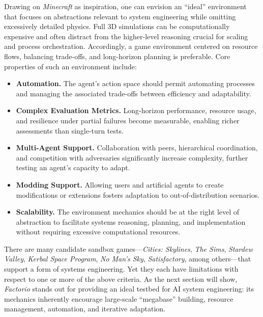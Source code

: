 Drawing on \textit{Minecraft} as inspiration, one can envision an “ideal” environment that focuses on abstractions relevant to system engineering while omitting excessively detailed physics. Full 3D simulations can be computationally expensive and often distract from the higher-level reasoning crucial for scaling and process orchestration. Accordingly, a game environment centered on resource flows, balancing trade-offs, and long-horizon planning is preferable. Core properties of such an environment include:
\begin{itemize}
    \item \textbf{Automation.} The agent’s action space should permit automating processes and managing the associated trade-offs between efficiency and adaptability.
    \item \textbf{Complex Evaluation Metrics.} Long-horizon performance, resource usage, and resilience under partial failures become measurable, enabling richer assessments than single-turn tests.
    \item \textbf{Multi-Agent Support.} Collaboration with peers, hierarchical coordination, and competition with adversaries significantly increase complexity, further testing an agent’s capacity to adapt.
    \item \textbf{Modding Support.} Allowing users and artificial agents to create modifications or extensions fosters adaptation to out-of-distribution scenarios.
    \item \textbf{Scalability.} The environment mechanics should be at the right level of abstraction to facilitate systems reasoning, planning, and implementation without requiring excessive computational resources.
\end{itemize}

There are many candidate sandbox games—\textit{Cities: Skylines}, \textit{The Sims}, \textit{Stardew Valley}, \textit{Kerbal Space Program}, \textit{No Man's Sky}, \textit{Satisfactory}, among others—that support a form of systems engineering. Yet they each have limitations with respect to one or more of the above criteria. As the next section will show, \emph{Factorio} stands out for providing an ideal testbed for AI system engineering: its mechanics inherently encourage large-scale “megabase” building, resource management, automation, and iterative adaptation.
